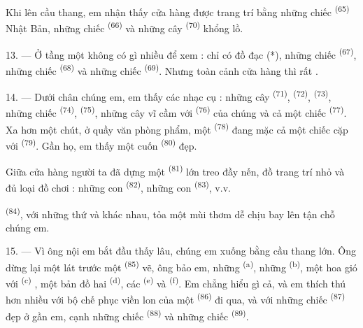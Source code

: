Khi lên cầu thang, em nhận thấy cửa hàng được trang trí bằng những chiếc  \textsuperscript{(65)} Nhật Bản, những chiếc  \textsuperscript{(66)} và
những cây  \textsuperscript{(70)} khổng lồ.

13. --- Ở tầng một không có gì nhiều để xem : chỉ có đồ đạc (*), những chiếc  \textsuperscript{(67)}, những chiếc  \textsuperscript{(68)} và
những chiếc  \textsuperscript{(69)}. Nhưng toàn cảnh cửa hàng thì rất
.

14. --- Dưới chân chúng em, em thấy các nhạc cụ : những cây 
\textsuperscript{(71)},  \textsuperscript{(72)}, 
\textsuperscript{(73)}, những chiếc  \textsuperscript{(74)},
 \textsuperscript{(75)}, những cây vĩ cầm với 
\textsuperscript{(76)} của chúng và cả một chiếc 
\textsuperscript{(77)}. Xa hơn một chút, ở quầy văn phòng phẩm, một 
\textsuperscript{(78)} đang mặc cả một chiếc cặp với 
\textsuperscript{(79)}. Gần họ, em thấy một cuốn 
\textsuperscript{(80)} đẹp.

Giữa cửa hàng người ta đã dựng một  \textsuperscript{(81)} lớn treo đầy
nến, đồ trang trí nhỏ và đủ loại đồ chơi : những con 
\textsuperscript{(82)}, những con  \textsuperscript{(83)}, v.v.

 \textsuperscript{(84)}, với những thứ  và
 khác nhau, tỏa một mùi thơm dễ chịu bay lên tận chỗ chúng em.

\VUsaut{3.4mm}
\VUsaut{2.8mm}

15. --- Vì ông nội em bắt đầu thấy lâu, chúng em xuống bằng cầu thang lớn. Ông dừng lại
một lát trước một  \textsuperscript{(85)} vẽ, ông bảo em, những
 \textsuperscript{(a)}, những 
\textsuperscript{(b)}, một hoa gió với  \textsuperscript{(c)}
, một bản đồ hai 
\textsuperscript{(d)}, các  \textsuperscript{(e)} và  \textsuperscript{(f)}. Em chẳng hiểu gì cả, và em thích thú hơn nhiều với bộ chế
phục viền lon của một  \textsuperscript{(86)} đi qua, và với
những chiếc  \textsuperscript{(87)} đẹp ở gần em, cạnh những chiếc
 \textsuperscript{(88)} và những chiếc 
\textsuperscript{(89)}.

